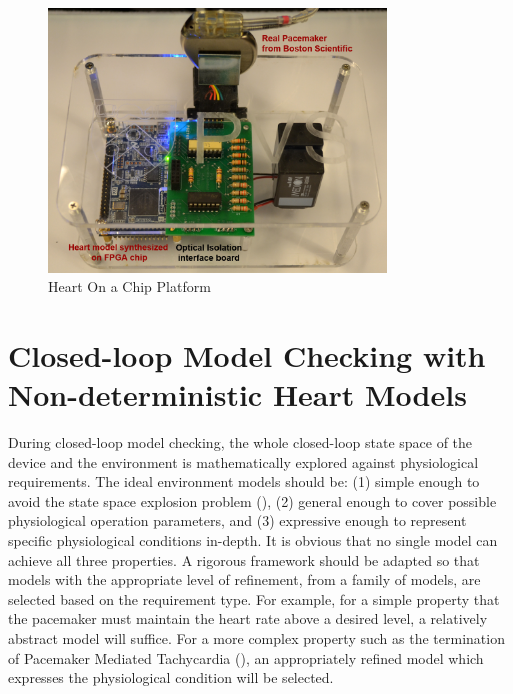 \begin{figure}[!b]
\center
		\includegraphics[width=0.8\textwidth]{figs/PVS.pdf}
\caption{Heart On a Chip Platform}
\label{fig:HOC}
\end{figure}
\section{Closed-loop Model Checking with Non-deterministic Heart Models }
During closed-loop model checking, the whole closed-loop state space of the device and the environment is mathematically explored against physiological requirements. The  ideal environment models should be: (1) simple enough to avoid the state space explosion problem (\cite{Abstraction}), (2) general enough to cover possible physiological operation parameters, and (3) expressive enough to represent specific physiological conditions in-depth. It is obvious that no single model can achieve all three properties. A rigorous framework should be adapted so that models with the appropriate level of refinement, from a family of models, are selected based on the requirement type. For example, for a simple property that the pacemaker must maintain the heart rate above a desired level, a relatively abstract model will suffice. For a more complex property such as the termination of Pacemaker Mediated Tachycardia (\cite{josephson}), an appropriately refined model which expresses the physiological condition will be selected.

